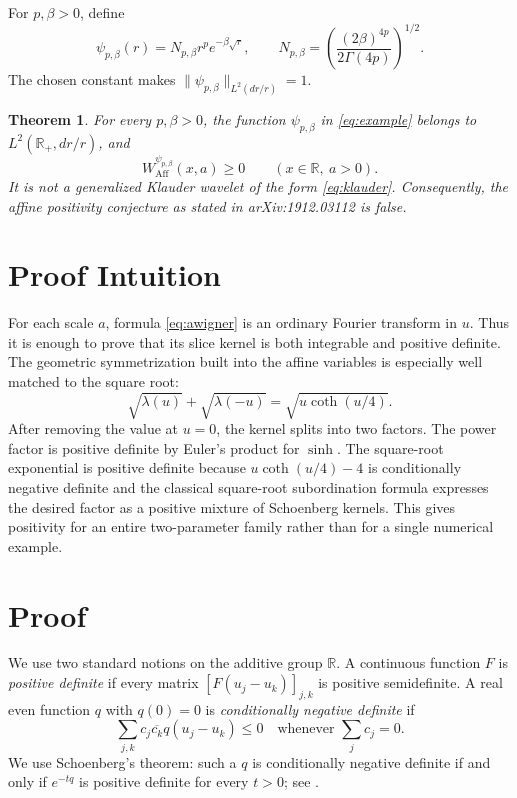 \documentclass[11pt]{article}
\newtheorem{theorem}{Theorem}
\newcommand{\R}{\mathbb R}
\newcommand{\WAff}{W_{\mathrm{Aff}}}
\begin{document}
For \(p,\beta>0\), define
\begin{equation}\label{eq:example}
 \psi_{p,\beta}(r)=N_{p,\beta}r^p e^{-\beta\sqrt r},
 \qquad
 N_{p,\beta}=\left(\frac{(2\beta)^{4p}}
 {2\Gamma(4p)}\right)^{1/2}.
\end{equation}
The chosen constant makes \(\|\psi_{p,\beta}\|_{L^2(dr/r)}=1\).

\begin{theorem}\label{thm:main}
For every \(p,\beta>0\), the function \(\psi_{p,\beta}\) in
\eqref{eq:example} belongs to \(L^2(\R_+,dr/r)\), and
\[
  \WAff^{\psi_{p,\beta}}(x,a)\geq 0
  \qquad (x\in\R,\ a>0).
\]
It is not a generalized Klauder wavelet of the form \eqref{eq:klauder}.
Consequently, the affine positivity conjecture as stated in
arXiv:1912.03112 is false.
\end{theorem}

\section*{Proof Intuition}

For each scale \(a\), formula \eqref{eq:awigner} is an ordinary Fourier
transform in \(u\). Thus it is enough to prove that its slice kernel is both
integrable and positive definite. The geometric symmetrization built into
the affine variables is especially well matched to the square root:
\[
 \sqrt{\lambda(u)}+\sqrt{\lambda(-u)}
   =\sqrt{u\coth(u/4)}.
\]
After removing the value at \(u=0\), the kernel splits into two factors. The
power factor is positive definite by Euler's product for \(\sinh\). The
square-root exponential is positive definite because
\(u\coth(u/4)-4\) is conditionally negative definite and the classical
square-root subordination formula expresses the desired factor as a positive
mixture of Schoenberg kernels. This gives positivity for an entire
two-parameter family rather than for a single numerical example.

\section*{Proof}

We use two standard notions on the additive group \(\R\). A continuous
function \(F\) is \emph{positive definite} if every matrix
\([F(u_j-u_k)]_{j,k}\) is positive semidefinite. A real even function \(q\)
with \(q(0)=0\) is \emph{conditionally negative definite} if
\[
 \sum_{j,k}c_j\overline{c_k}q(u_j-u_k)\leq0
 \quad\text{whenever }\sum_j c_j=0.
\]
We use Schoenberg's theorem: such a \(q\) is conditionally negative definite
if and only if \(e^{-tq}\) is positive definite for every \(t>0\); see
\cite[Chapter 3]{BergChristensenRessel}.
\end{document}

